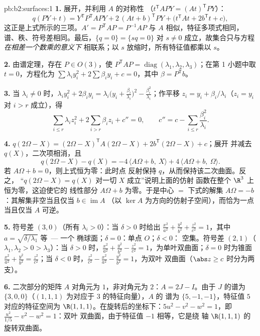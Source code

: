 \begin{solution}{pb:b2:surfaces:1}
\textbf{1.} 展开，并利用 $A$ 的对称性
（$t^{\mathsf T}\!APY = (At)^{\mathsf T}PY$）：
\[
q(PY + t) = Y^{\mathsf T}P^{\mathsf T}\!APY +
2\,(At + b)^{\mathsf T}PY + \bigl(t^{\mathsf T}\!At +
2b^{\mathsf T}t + c\bigr),
\]
这正是上式所示的三项。$A' = P^{\mathsf T}\!AP =
P^{-1}AP$ 与 $A$ 相似，特征多项式相同，
谱、秩、符号差相同。最后，$\{q = 0\} = \{sq = 0\}$
对 $s \neq 0$ 成立，故集合只与方程\emph{在相差一个数乘的意义下}
相联系；以 $s$ 放缩时，所有特征值都乘以
$s$。

\textbf{2.} 由谱定理，存在 $P \in O(3)$，使
$P^{\mathsf T}\!AP = \operatorname{diag}(\lambda_1, \lambda_2,
\lambda_3)$；在第 1 小题中取 $t = 0$，方程化为
$\sum\lambda_iy_i^2 + 2\sum\beta_iy_i + c = 0$，其中 $\beta =
P^{\mathsf T}b$。

\textbf{3.} 当 $\lambda_i \neq 0$ 时，$\lambda_iy_i^2 +
2\beta_iy_i = \lambda_i\bigl(y_i +
\frac{\beta_i}{\lambda_i}\bigr)^2 -
\frac{\beta_i^2}{\lambda_i}$；作平移 $z_i = y_i +
\beta_i/\lambda_i$（$z_i = y_i$ 对 $i > r$ 成立），得
\[
\sum_{i \leq r}\lambda_iz_i^2 + 2\sum_{i > r}\beta_iz_i +
c'' = 0, \qquad
c'' = c - \sum_{i\leq r}\frac{\beta_i^2}{\lambda_i}.
\]

\textbf{4.} $q(2\Omega - X) = (2\Omega - X)^{\mathsf T}
A(2\Omega - X) + 2b^{\mathsf T}(2\Omega - X) + c$；展开
并减去 $q(X)$，二次项相消，且
\[
q(2\Omega - X) - q(X) = -4\,\langle A\Omega + b,\ X\rangle +
4\,\langle A\Omega + b,\ \Omega\rangle .
\]
若 $A\Omega + b = 0$，则上式恒为零：此时点
反射保持 $q$，从而保持该二次曲面。反之，
“$q(2\Omega - X) = q(X)$ 对一切 $X$ 成立”说明上面的仿射
函数在整个 $\R^3$ 上恒为零，这迫使它的
线性部分 $A\Omega + b$ 为零。于是中心 $=$ 下式的解集
$A\Omega = -b$：其解集非空当且仅当 $b \in \operatorname{im}A$
（以 $\ker A$ 为方向的仿射子空间），而恰为一点
当且仅当 $A$ 可逆。

\textbf{5.} 符号差 $(3,0)$（所有 $\lambda_i > 0$）：当 $\delta >
0$ 时给出 $\frac{x^2}{a^2} + \frac{y^2}{b^2} + \frac{z^2}{c^2}
= 1$，其中 $a = \sqrt{\delta/\lambda_1}$ 等\ --- 一个
椭球面；$\delta = 0$：单点 $O$；$\delta < 0$：
空集。符号差 $(2,1)$（$\lambda_1, \lambda_2 > 0 >
\lambda_3$）：当 $\delta > 0$ 时，$\frac{x^2}{a^2} + \frac{y^2}{b^2}
- \frac{z^2}{c^2} = 1$，为单叶双曲面；$\delta =
0$ 时为锥面 $\frac{x^2}{a^2} + \frac{y^2}{b^2} =
\frac{z^2}{c^2}$；当 $\delta < 0$ 时，$\frac{z^2}{c^2} -
\frac{x^2}{a^2} - \frac{y^2}{b^2} = 1$，为双叶
双曲面（$\abs z \geq c$ 时分为两支）。

\textbf{6.} 二次部分的矩阵 $A$ 对角元为
$1$，非对角元为 $2$：$A = 2J - I$。由于 $J$ 的谱为
$\{3, 0, 0\}$（$(1,1,1)$ 为对应于 $3$ 的特征向量），$A$ 的
谱为 $\{5, -1, -1\}$，特征值 $5$ 对应的特征空间为
$\R(1,1,1)$。在旋转后的坐标下：$5u^2 - v^2 - w^2 =
1$，即 $\frac{u^2}{1/5} - v^2 - w^2 = 1$：双叶
双曲面，由于特征值 $-1$ 相等，它是绕
轴 $\R(1,1,1)$ 的旋转双曲面。


\end{solution}
